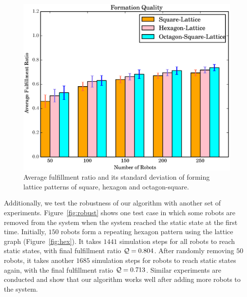 \begin{figure}
    \centering
   \includegraphics[width=\textwidth]{figs/exp_qual}
    \caption{Average fulfillment ratio and its standard deviation of forming lattice patterns of square, hexagon and octagon-square.} 
    \label{fig:exp-qual}
\end{figure}


Additionally, we test the robustness of our algorithm with another set of experiments.
%
Figure~\ref{fig:robust} shows one test case in which some robots are removed from the system when the system reached the static state at the first time.
%
Initially, $150$ robots form a repeating hexagon pattern using the lattice graph (Figure~\ref{fig:hex}).  
%
It takes $1441$ simulation steps for all robots to reach static states, with final fulfillment ratio $\mathcal{Q}=0.804$. 
%
After randomly removing $50$ robots, it takes another $1685$ simulation steps for robots to reach static states again, with the final fulfillment ratio $\mathcal{Q}=0.713$. 
Similar experiments are conducted and show that our algorithm works well after adding more robots to the system.

